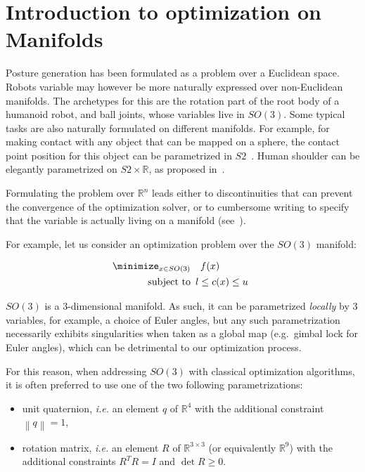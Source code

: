 \section{Introduction to optimization on Manifolds}
\label{sec:introduction_to_optimization_on_manifolds}

Posture generation has been formulated as a problem over a Euclidean space.
Robots variable may however be more naturally expressed over non-Euclidean manifolds.
The archetypes for this are the rotation part of the root body of a humanoid robot, and ball joints, whose variables live in $SO(3)$.
Some typical tasks are also naturally formulated on different manifolds.
For example, for making contact with any object that can be mapped on a sphere, the contact point position for this object can be parametrized in $S2$~\cite{escande:icra:2016}.
Human shoulder can be elegantly parametrized on $S2\times\mathbb{R}$, as proposed in~\cite{baerlocher}.

Formulating the problem over $\mathbb{R}^n$ leads either to discontinuities that can prevent the convergence of the optimization solver, or to cumbersome writing to specify that the variable is actually living on a manifold (see~\cite{bouyarmane:humanoids:2012}).

For example, let us consider an optimization problem over the $SO(3)$ manifold:

\begin{align}
\label{eq:pb_on_SO3}
  \minimize_{x \in SO(3)} & \quad f(x)\\
  \text{subject to}&
  \begin{array}{lr}
    l \leq c(x) \leq u \nonumber
  \end{array}
\end{align}

$SO(3)$ is a 3-dimensional manifold.
As such, it can be parametrized \emph{locally} by $3$ variables, for example, a choice of Euler angles, but any such parametrization necessarily exhibits singularities when taken as a global map (e.g.\ gimbal lock for Euler angles), which can be detrimental to our optimization process.

For this reason, when addressing $SO(3)$ with classical optimization algorithms, it is often preferred to use one of the two following parametrizations:
\begin{itemize}
    \item unit quaternion, \emph{i.e.} an element $q$ of $\mathbb{R}^4$ with the additional constraint $\left\|q\right\| = 1$,
    \item rotation matrix, \emph{i.e.} an element $R$ of $\mathbb{R}^{3 \times 3}$ (or equivalently $\mathbb{R}^9$) with the additional constraints $R^T R = I$ and $\det{R} \geq 0$.
\end{itemize}

